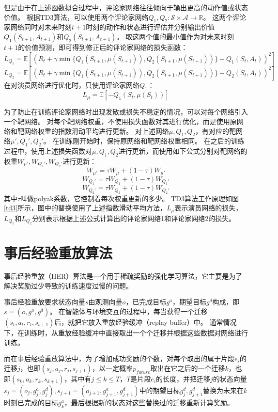     但是由于在上述函数拟合过程中，评论家网络往往倾向于输出更高的动作值或状态价值。
    根据TD3算法\cite{DBLP:journals/corr/abs-1802-09477}，可以使用两个评论家网络$Q_1,Q_2:\mathcal S\times\mathcal A\to \mathbb R$。
    这两个评论家网络同时对未来时刻$t+1$时刻的动作和状态进行评估并分别输出价值$Q_1(S_{t+1},A_{t+1})$和$Q_2(S_{t+1},A_{t+1})$。
    取这两个值的最小值作为对未来时刻$t+1$的价值预测，即可得到修正后的评论家网络的损失函数：
    $$L_{Q_1} = \mathbb E[(R_t + \gamma \min\{ Q_1(S_{t+1},\mu(S_{t+1})), Q_2(S_{t+1},\mu(S_{t+1})) \} - Q_1(S_t, A_t))^2]$$
    $$L_{Q_2} = \mathbb E[(R_t + \gamma \min\{ Q_1(S_{t+1},\mu(S_{t+1})), Q_2(S_{t+1},\mu(S_{t+1})) \} - Q_2(S_t, A_t))^2]$$
    在对演员网络进行优化时，只使用评论家网络$Q_1$：
    $$L_\mu = \mathbb E[-Q_1(S_t, \mu(S_t))]$$

    为了防止在训练评论家网络时出现发散或损失不稳定的情况，可以对每个网络引入一个靶网络。
    对每个靶网络权重，不使用损失函数对其进行优化，而是使用原网络和靶网络权重的指数滑动平均进行更新。
    对上述网络$\mu, Q_1, Q_2$，有对应的靶网络$\mu',Q_1',Q_2'$。
    在训练刚开始时，保持原网络和靶网络权重相同。
    在之后的训练过程中，使用上述损失函数对$\mu, Q_1, Q_2$进行更新，而使用如下公式分别对靶网络的权重$W_{\mu'},W_{Q_1'}, W_{Q_2'}$进行更新：
    $$W_{\mu'} = \tau W_\mu + (1-\tau) W_{\mu'}$$
    $$W_{Q_1'} = \tau W_{Q_1} + (1-\tau) W_{Q_1'}$$
    $$W_{Q_2'} = \tau W_{Q_2} + (1-\tau) W_{Q_2'}$$
    其中$\tau$叫做polyak系数，它控制着每次权重更新的多少。
    TD3算法工作原理如图\ref{td3}所示，图中的替换使用了上述指数滑动平均方法，$L_\mu$表示演员网络的损失，$L_{Q_1}$和$L_{Q_2}$分别表示根据上述公式计算出的评论家网络1和评论家网络2的损失。
    

    \section{事后经验重放算法}\label{HERsec}
    事后经验重放（HER）算法\cite{DBLP:journals/corr/AndrychowiczWRS17}是一个用于稀疏奖励的强化学习算法，它主要是为了解决奖励过少导致的训练速度过慢的问题。
    
    事后经验重放要求状态向量$s$由观测向量$o$，已完成目标$g^a$，期望目标$g^d$构成，即$s=(o, g^a, g^d)$。
    在智能体与环境交互的过程中，每当获得一个迁移$(s_t, a_t, r_t, s_{t+1})$后，就把它放入重放经验缓冲（replay buffer）中。
    通常情况下，在训练时，从重放经验缓冲中直接取出一个个迁移并根据这些数据对网络进行训练。

    而在事后经验重放算法中，为了增加成功奖励的个数，对每个取出的属于片段$e_i$的迁移$j$，也即$(s_j, a_j, r_j, s_{j+1})$，以一定概率$p_{future}$取出在它之后的一个迁移$k$，也即$(s_k, a_k, r_k, s_{k+1})$，其中有$j\leq k\leq T$，$T$是片段$e_i$的长度，并把迁移$j$的状态向量$s_j=(o_j,g^a_j, g^d_j), s_{j+1}=(o_{j+1},g^a_{j+1}, g^d_{j+1})$中的期望目标$g^d_{j}, g^d_{j+1}$替换为未来在$k$时刻已完成的目标$g^a_{k}$，最后根据新的状态对这些替换过的迁移重新计算奖励。

